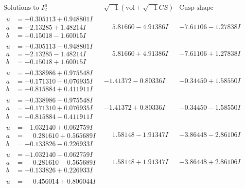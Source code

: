 \documentclass[1p]{elsarticle_modified}
\theoremstyle{definition}
\newcommand{\I}{\sqrt{-1}}
\begin{document}
$$\begin{array}{c|c|c}  
\text{Solutions to }I^u_{2}& \I (\text{vol} + \sqrt{-1}CS) & \text{Cusp shape}\\
 \hline 
\begin{aligned}
u &= -0.305113 + 0.948801 I \\
a &= -2.13285 + 1.48214 I \\
b &= -0.15018 - 1.60015 I\end{aligned}
 & \phantom{-}5.81660 - 4.91386 I & -7.61106 - 1.27838 I \\ \hline\begin{aligned}
u &= -0.305113 - 0.948801 I \\
a &= -2.13285 - 1.48214 I \\
b &= -0.15018 + 1.60015 I\end{aligned}
 & \phantom{-}5.81660 + 4.91386 I & -7.61106 + 1.27838 I \\ \hline\begin{aligned}
u &= -0.338986 + 0.975548 I \\
a &= -0.171310 - 0.076935 I \\
b &= -0.815884 + 0.411911 I\end{aligned}
 & -1.41372 - 0.80336 I & -0.34450 + 1.58550 I \\ \hline\begin{aligned}
u &= -0.338986 - 0.975548 I \\
a &= -0.171310 + 0.076935 I \\
b &= -0.815884 - 0.411911 I\end{aligned}
 & -1.41372 + 0.80336 I & -0.34450 - 1.58550 I \\ \hline\begin{aligned}
u &= -1.032140 + 0.062759 I \\
a &= \phantom{-}0.281610 + 0.565689 I \\
b &= -0.133826 - 0.226933 I\end{aligned}
 & \phantom{-}1.58148 - 1.91347 I & -3.86448 - 2.86106 I \\ \hline\begin{aligned}
u &= -1.032140 - 0.062759 I \\
a &= \phantom{-}0.281610 - 0.565689 I \\
b &= -0.133826 + 0.226933 I\end{aligned}
 & \phantom{-}1.58148 + 1.91347 I & -3.86448 + 2.86106 I \\ \hline\begin{aligned}
u &= \phantom{-}0.456014 + 0.806044 I \\

\end{aligned}
\end{array}$$
\end{document}
